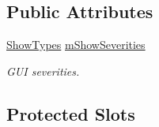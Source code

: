 \subsection*{Public Attributes}
\begin{DoxyCompactItemize}
\item 
\hyperlink{class_show_types}{Show\-Types} \hyperlink{class_results_tree_a5c18a240324385c3d7eea5fd247ffe95}{m\-Show\-Severities}
\begin{DoxyCompactList}\small\item\em G\-U\-I severities. \end{DoxyCompactList}\end{DoxyCompactItemize}
\subsection*{Protected Slots}

